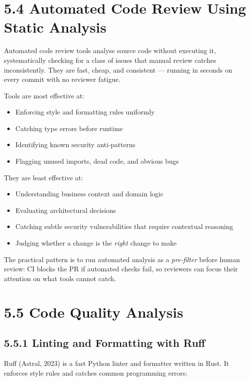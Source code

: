 \documentclass[11pt,a4paper]{book}
\begin{document}
\medskip

\section{5.4 Automated Code Review Using Static Analysis}

Automated code review tools analyse source code without executing it, systematically checking for a class of issues that manual review catches inconsistently. They are fast, cheap, and consistent --- running in seconds on every commit with no reviewer fatigue.

Tools are most effective at:
\begin{itemize}
  \item Enforcing style and formatting rules uniformly
  \item Catching type errors before runtime
  \item Identifying known security anti-patterns
  \item Flagging unused imports, dead code, and obvious bugs
\end{itemize}

They are least effective at:
\begin{itemize}
  \item Understanding business context and domain logic
  \item Evaluating architectural decisions
  \item Catching subtle security vulnerabilities that require contextual reasoning
  \item Judging whether a change is the \textit{right} change to make
\end{itemize}

The practical pattern is to run automated analysis as a \textit{pre-filter} before human review: CI blocks the PR if automated checks fail, so reviewers can focus their attention on what tools cannot catch.

\medskip

\section{5.5 Code Quality Analysis}

\subsection{5.5.1 Linting and Formatting with Ruff}

Ruff (Astral, 2023) is a fast Python linter and formatter written in Rust. It enforces style rules and catches common programming errors:
\end{document}
